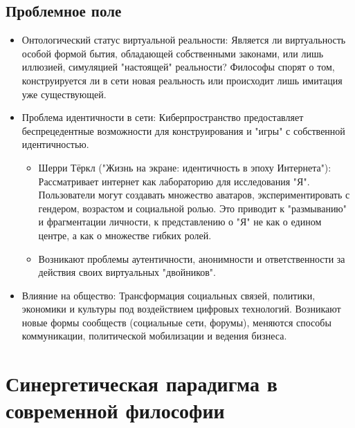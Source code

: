 \documentclass[12pt,a4paper]{article}
\begin{document}
	\subsection{Проблемное поле}
	\begin{itemize}
		\item Онтологический статус виртуальной реальности: Является ли виртуальность особой формой бытия, обладающей собственными законами, или лишь иллюзией, симуляцией "настоящей" реальности? Философы спорят о том, конструируется ли в сети новая реальность или происходит лишь имитация уже существующей.
		\item Проблема идентичности в сети: Киберпространство предоставляет беспрецедентные возможности для конструирования и "игры" с собственной идентичностью.
		\begin{itemize}
			\item Шерри Тёркл ("Жизнь на экране: идентичность в эпоху Интернета"): Рассматривает интернет как лабораторию для исследования "Я". Пользователи могут создавать множество аватаров, экспериментировать с гендером, возрастом и социальной ролью. Это приводит к "размыванию" и фрагментации личности, к представлению о "Я" не как о едином центре, а как о множестве гибких ролей.
			\item Возникают проблемы аутентичности, анонимности и ответственности за действия своих виртуальных "двойников".
		\end{itemize}
		\item Влияние на общество: Трансформация социальных связей, политики, экономики и культуры под воздействием цифровых технологий. Возникают новые формы сообществ (социальные сети, форумы), меняются способы коммуникации, политической мобилизации и ведения бизнеса.
	\end{itemize}
	
	\section{Синергетическая парадигма в современной философии~\checkmark}
\end{document}
